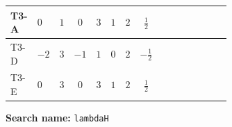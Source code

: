 \documentclass[8pt]{article}
\begin{document}
\begin{landscape}
\begin{longtable}{@{}llcccccc >{\raggedright\arraybackslash}p{0.21\linewidth} >{\raggedright\arraybackslash}p{0.21\linewidth} >{\raggedright\arraybackslash}p{0.21\linewidth}@{}}
\midrule
T3-A & $0$ & $1$ & $0$ & $3$ & $1$ & $2$ & $\frac{1}{2}$ & \scriptsize\adjustbox{max width=\linewidth}{$\begin{gathered} +{g_Y}^2 \left(\frac{3 {g_2}^2}{2}-3 {\lambda_H}\right)\end{gathered}$} & \scriptsize\adjustbox{max width=\linewidth}{$\begin{gathered} -9 {g_2}^2 {\lambda_H}\end{gathered}$} & \scriptsize\adjustbox{max width=\linewidth}{$\begin{gathered} +\frac{3 {g_Y}^4}{4}\end{gathered}$} \\
\midrule
T3-D & $-2$ & $3$ & $-1$ & $1$ & $0$ & $2$ & $-\frac{1}{2}$ & \scriptsize\adjustbox{max width=\linewidth}{$\begin{gathered} +{g_Y}^2 \left(\frac{3 {g_2}^2}{2}-3 {\lambda_H}\right)\end{gathered}$} & \scriptsize\adjustbox{max width=\linewidth}{$\begin{gathered} -9 {g_2}^2 {\lambda_H}\end{gathered}$} & \scriptsize\adjustbox{max width=\linewidth}{$\begin{gathered} +\frac{3 {g_Y}^4}{4}\end{gathered}$} \\
\midrule
T3-E & $0$ & $3$ & $0$ & $3$ & $1$ & $2$ & $\frac{1}{2}$ & \scriptsize\adjustbox{max width=\linewidth}{$\begin{gathered} +{g_Y}^2 \left(\frac{3 {g_2}^2}{2}-3 {\lambda_H}\right)\end{gathered}$} & \scriptsize\adjustbox{max width=\linewidth}{$\begin{gathered} -9 {g_2}^2 {\lambda_H}\end{gathered}$} & \scriptsize\adjustbox{max width=\linewidth}{$\begin{gathered} +\frac{3 {g_Y}^4}{4}\end{gathered}$} \\
\midrule
\bottomrule
\end{longtable}
\clearpage
\noindent\textbf{Search name: }\texttt{lambdaH}\par\smallskip

\end{landscape}
\end{document}
